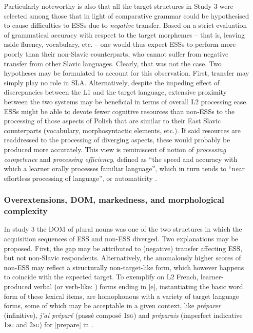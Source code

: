 \documentclass[output=paper,            colorlinks, citecolor=brown            		  ]{langscibook}
\begin{document}
Particularly noteworthy is also that all the target structures in Study 3 were selected among those that in light of comparative grammar could be hypothesised to cause difficulties to ESSs due to \textit{negative} transfer. Based on a strict evaluation of grammatical accuracy with respect to the target morphemes -- that is, leaving aside fluency, vocabulary, etc. -- one would thus expect ESSs to perform more poorly than their non-Slavic counterparts, who cannot suffer from negative transfer from other Slavic languages. Clearly, that was not the case. Two hypotheses may be formulated to account for this observation. First, transfer may simply play no role in SLA. Alternatively, despite the impeding effect of discrepancies between the L1 and the target language, extensive proximity between the two systems may be beneficial in terms of overall L2 processing ease. ESSs might be able to devote fewer cognitive resources than non-ESSs to the processing of those aspects of Polish that are similar to their East Slavic counterparts (vocabulary, morphosyntactic elements, etc.). If said resources are readdressed to the processing of diverging aspects, these would probably be produced more accurately. This view is reminiscent of  notion of \textit{processing competence} and  \textit{processing efficiency}, defined as “the speed and accuracy with which a learner orally processes familiar language”, which in turn tends to “near effortless processing of language”, or automaticity \citep{DeKeyser2001}.

\subsubsection{Overextensions, DOM, markedness, and morphological complexity}
\label{sec:saturno:4.2.2}
In study 3 the DOM of plural nouns was one of the two structures in which the acquisition sequences of ESS and non-ESS diverged. Two explanations may be proposed. First, the gap may be attributed to (negative) transfer affecting ESS, but not non-Slavic respondents. Alternatively, the anomalously higher scores of non-ESS may reflect a structurally non-target-like form, which however happens to coincide with the expected target. To exemplify on L2 French, learner-produced verbal (or verb-like: \citealt[312]{KleinPerdue1997}) forms ending in [e], instantiating the basic word form of these lexical items, are homophonous with a variety of target language forms, some of which may be acceptable in a given context, like \textit{préparer} (infinitive), \textit{j’ai préparé} (passé composé \textsc{1sg}) and \textit{préparais} (imperfect indicative \textsc{1sg} and \textsc{2sg}) for [prepare] in .
\end{document}
